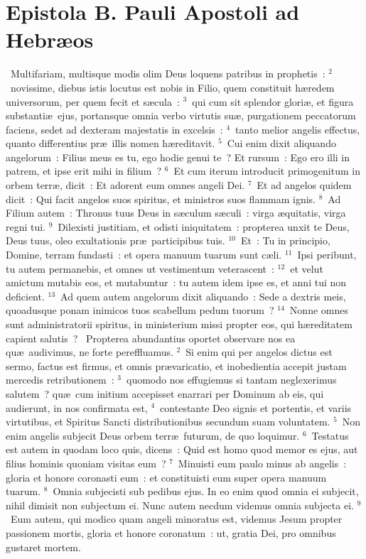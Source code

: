 {\centering \section*{Epistola B. Pauli Apostoli ad Hebræos}}\thispagestyle{empty}

~Multifariam, multisque modis olim Deus loquens patribus in prophetis~:
${}^{2}$~novissime, diebus istis locutus est nobis in Filio, quem constituit h\ae redem universorum, per quem fecit et s\ae cula~:
${}^{3}$~qui cum sit splendor glori\ae , et figura substanti\ae\ ejus, portansque omnia verbo virtutis su\ae , purgationem peccatorum faciens, sedet ad dexteram majestatis in excelsis~:
${}^{4}$~tanto melior angelis effectus, quanto differentius pr\ae\ illis nomen h\ae reditavit.
${}^{5}$~Cui enim dixit aliquando angelorum~: Filius meus es tu, ego hodie genui te~? Et rursum~: Ego ero illi in patrem, et ipse erit mihi in filium~?
${}^{6}$~Et cum iterum introducit primogenitum in orbem terr\ae , dicit~: Et adorent eum omnes angeli Dei.
${}^{7}$~Et ad angelos quidem dicit~: Qui facit angelos suos spiritus, et ministros suos flammam ignis.
${}^{8}$~Ad Filium autem~: Thronus tuus Deus in s\ae culum s\ae culi~: virga \ae quitatis, virga regni tui.
${}^{9}$~Dilexisti justitiam, et odisti iniquitatem~: propterea unxit te Deus, Deus tuus, oleo exultationis pr\ae\ participibus tuis.
${}^{10}$~Et~: Tu in principio, Domine, terram fundasti~: et opera manuum tuarum sunt c\ae li.
${}^{11}$~Ipsi peribunt, tu autem permanebis, et omnes ut vestimentum veterascent~:
${}^{12}$~et velut amictum mutabis eos, et mutabuntur~: tu autem idem ipse es, et anni tui non deficient.
${}^{13}$~Ad quem autem angelorum dixit aliquando~: Sede a dextris meis, quoadusque ponam inimicos tuos scabellum pedum tuorum~?
${}^{14}$~Nonne omnes sunt administratorii spiritus, in ministerium missi propter eos, qui h\ae reditatem capient salutis~?
~Propterea abundantius oportet observare nos ea qu\ae\ audivimus, ne forte pereffluamus.
${}^{2}$~Si enim qui per angelos dictus est sermo, factus est firmus, et omnis pr\ae varicatio, et inobedientia accepit justam mercedis retributionem~:
${}^{3}$~quomodo nos effugiemus si tantam neglexerimus salutem~? qu\ae\ cum initium accepisset enarrari per Dominum ab eis, qui audierunt, in nos confirmata est,
${}^{4}$~contestante Deo signis et portentis, et variis virtutibus, et Spiritus Sancti distributionibus secundum suam voluntatem.
${}^{5}$~Non enim angelis subjecit Deus orbem terr\ae\ futurum, de quo loquimur.
${}^{6}$~Testatus est autem in quodam loco quis, dicens~: Quid est homo quod memor es ejus, aut filius hominis quoniam visitas eum~?
${}^{7}$~Minuisti eum paulo minus ab angelis~: gloria et honore coronasti eum~: et constituisti eum super opera manuum tuarum.
${}^{8}$~Omnia subjecisti sub pedibus ejus. In eo enim quod omnia ei subjecit, nihil dimisit non subjectum ei. Nunc autem necdum videmus omnia subjecta ei.
${}^{9}$~Eum autem, qui modico quam angeli minoratus est, videmus Jesum propter passionem mortis, gloria et honore coronatum~: ut, gratia Dei, pro omnibus gustaret mortem.


